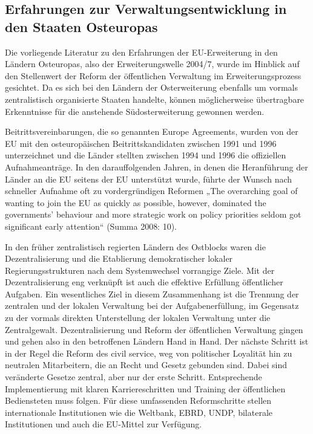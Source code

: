 \subsection{Erfahrungen zur Verwaltungsentwicklung in den Staaten Osteuropas}
Die vorliegende Literatur zu den Erfahrungen der EU-Erweiterung in den Ländern Osteuropas, also der Erweiterungswelle 2004/7, wurde im Hinblick auf den Stellenwert der Reform der öffentlichen Verwaltung im Erweiterungsprozess gesichtet. Da es sich bei den Ländern der Osterweiterung ebenfalls um vormals zentralistisch organisierte Staaten handelte, können möglicherweise übertragbare Erkenntnisse für die anstehende Südosterweiterung gewonnen werden. \par

Beitrittsvereinbarungen, die so genannten Europe Agreements, wurden von der EU mit den osteuropäischen Beitrittskandidaten zwischen 1991 und 1996 unterzeichnet und die Länder stellten zwischen 1994 und 1996 die offiziellen Aufnahmeanträge. In den darauffolgenden Jahren, in denen die Heranführung der Länder an die EU seitens der EU unterstützt wurde, führte der Wunsch nach schneller Aufnahme oft zu vordergründigen Reformen „The overarching goal of wanting to join the EU as quickly as possible, however, dominated the governments’ behaviour and more strategic work on policy priorities seldom got significant early attention“ (Summa 2008: 10).\par
In den früher zentralistisch regierten Ländern des Ostblocks waren die Dezentralisierung und die Etablierung demokratischer lokaler Regierungsstrukturen nach dem Systemwechsel vorrangige Ziele. Mit der Dezentralisierung eng verknüpft ist auch die effektive Erfüllung öffentlicher Aufgaben. Ein wesentliches Ziel in diesem Zusammenhang ist die Trennung der zentralen und der lokalen Verwaltung bei der Aufgabenerfüllung, im Gegensatz zu der vormals direkten Unterstellung der lokalen Verwaltung unter die Zentralgewalt. Dezentralisierung und Reform der öffentlichen Verwaltung gingen und gehen also in den betroffenen Ländern Hand in Hand. Der nächste Schritt ist in der Regel die Reform des civil service, weg von politischer Loyalität hin zu neutralen Mitarbeitern, die an Recht und Gesetz gebunden sind. Dabei sind veränderte Gesetze zentral, aber nur der erste Schritt. Entsprechende Implementierung mit klaren Karriereschritten und Training der öffentlichen Bediensteten muss folgen. Für diese umfassenden Reformschritte stellen internationale Institutionen wie die Weltbank, EBRD, UNDP, bilaterale Institutionen und auch die EU-Mittel zur Verfügung.\par
